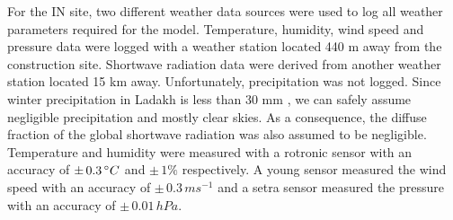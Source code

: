\documentclass[utf8]{frontiersSCNS}
\begin{document}
For the IN site, two different weather data sources were used to log all weather parameters required for the
model. Temperature, humidity, wind speed and pressure data were logged with a weather station located 440 m away
from the construction site. Shortwave radiation data were derived from another weather station located 15 km
away. Unfortunately, precipitation was not logged. Since winter precipitation in Ladakh is less than 30 mm
\citep{Nusser_2012}, we can safely assume negligible precipitation and mostly clear skies. As a consequence, the
diffuse fraction of the global shortwave radiation was also assumed to be negligible. Temperature and humidity
were measured with a rotronic sensor with an accuracy of $\pm\,0.3\, \degree C$ and $\pm\,1 \%$ respectively. A
young sensor measured the wind speed with an accuracy of $\pm\,0.3\, ms^{-1}$ and a setra sensor measured the
pressure with an accuracy of $\pm\,0.01\, hPa$. 
\end{document}
